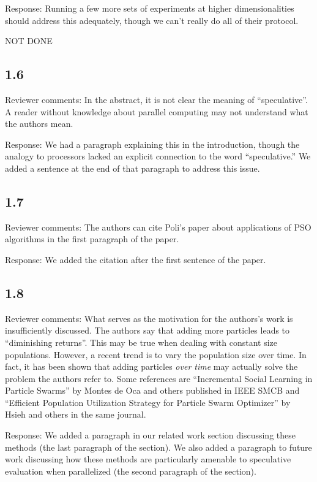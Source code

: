 \documentclass[onecolumn, 12pt]{article}
\begin{document}
Response: Running a few more sets of experiments at higher dimensionalities
should address this adequately, though we can't really do all of their
protocol.

NOT DONE

\subsection*{1.6}

Reviewer comments: In the abstract, it is not clear the meaning of
``speculative''. A reader without knowledge about parallel computing may not
understand what the authors mean.

Response: We had a paragraph explaining this in the introduction, though the
analogy to processors lacked an explicit connection to the word
``speculative.''  We added a sentence at the end of that paragraph to address
this issue.

\subsection*{1.7}

Reviewer comments: The authors can cite Poli's paper about applications of PSO
algorithms in the first paragraph of the paper.

Response: We added the citation after the first sentence of the paper.

\subsection*{1.8}

Reviewer comments: What serves as the motivation for the authors's work is
insufficiently discussed.  The authors say that adding more particles leads to
``diminishing returns''. This may be true when dealing with constant size
populations.  However, a recent trend is to vary the population size over time.
In fact, it has been shown that adding particles \emph{over time} may actually
solve the problem the authors refer to. Some references are ``Incremental
Social Learning in Particle Swarms'' by Montes de Oca and others published in
IEEE SMCB and ``Efficient Population Utilization Strategy for Particle Swarm
Optimizer'' by Hsieh and others in the same journal.

Response: We added a paragraph in our related work section discussing these
methods (the last paragraph of the section).  We also added a paragraph to
future work discussing how these methods are particularly amenable to
speculative evaluation when parallelized (the second paragraph of the section).
\end{document}
